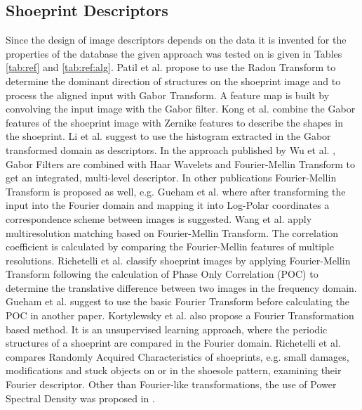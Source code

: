 \documentclass[draft,final]{vutinfth} %
\begin{document}
\subsection{Shoeprint Descriptors}
\par
Since the design of image descriptors depends on the data it is invented for the properties of the database the given approach was tested on is given in Tables \ref{tab:ref} and \ref{tab:ref:alg}.
Patil et al. \cite{patil2009rotation} propose to use the Radon Transform to determine the dominant direction of structures on the shoeprint image and to process the aligned input with Gabor Transform.
A feature map is built by convolving the input image with the Gabor filter.
Kong et al.  \cite{kong2014novel} combine the Gabor features of the shoeprint image with Zernike features to describe the shapes in the shoeprint.
Li et al. \cite{li2014retrieval} suggest to use the histogram extracted in the Gabor transformed domain as descriptors.
In the approach published by Wu et al.  \cite{wu2019crime}, Gabor Filters are combined with Haar Wavelets and Fourier-Mellin Transform to get an integrated, multi-level descriptor. 
In other publications Fourier-Mellin Transform is proposed as well, e.g. Gueham et al. \cite{gueham2008automatic} where after transforming the input into the Fourier domain and mapping it into Log-Polar coordinates a correspondence scheme between images is suggested.
Wang et al. \cite{wang2014automatic} apply multiresolution matching based on  Fourier-Mellin Transform.
The correlation coefficient is calculated by comparing the Fourier-Mellin features of multiple resolutions.
Richetelli et al. \cite{richetelli2017classification} classify shoeprint images by applying Fourier-Mellin Transform following the calculation of Phase Only Correlation (POC) to determine the translative difference between two images in the frequency domain.
Gueham et al. \cite{gueham2007automatic} suggest to use the basic Fourier Transform before calculating the POC in another paper.
Kortylewsky et al. \cite{kortylewski2014unsupervised} also propose a Fourier Transformation based method.
It is an unsupervised learning approach, where the periodic structures of a shoeprint are compared in the Fourier domain.
Richetelli et al. \cite{richetelli2017quantitative} compares Randomly Acquired Characteristics of shoeprints, e.g. small damages, modifications and stuck objects on or in the shoesole pattern, examining their Fourier descriptor.
Other than Fourier-like transformations, the use of Power Spectral Density was proposed in \cite{dardi2009texture}.
\end{document}

